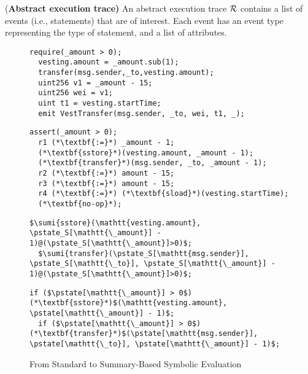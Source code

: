 \begin{definition}{{(\bf Abstract execution trace)}}
An abstract execution trace $\mathcal{R}$ contains a list of events (i.e., statements) that are of interest. Each event has an event type representing the type of statement, and a list
of attributes.
\end{definition}
    \begin{figure}[t!]
\begin{lstlisting}[title={(a) Solidity program}]
  require(_amount > 0);
  vesting.amount = _amount.sub(1);
  transfer(msg.sender,_to,vesting.amount);
  uint256 v1 = _amount - 15;
  uint256 wei = v1;
  uint t1 = vesting.startTime;
  emit VestTransfer(msg.sender, _to, wei, t1, _);
\end{lstlisting}
\begin{lstlisting}[title={(b) Symbolic evaluation}]
  assert(_amount > 0);
  r1 (*\textbf{:=}*) _amount - 1;
  (*\textbf{sstore}*)(vesting.amount, _amount - 1);
  (*\textbf{transfer}*)(msg.sender, _to, _amount - 1);
  r2 (*\textbf{:=}*) amount - 15;
  r3 (*\textbf{:=}*) amount - 15;
  r4 (*\textbf{:=}*) (*\textbf{sload}*)(vesting.startTime);
  (*\textbf{no-op}*);
\end{lstlisting}
\begin{lstlisting}[title={(c) Summary extraction}]
  $\sumi{sstore}(\mathtt{vesting.amount}, \pstate_S[\mathtt{\_amount}] - 1)@(\pstate_S[\mathtt{\_amount}]>0)$;
  $\sumi{transfer}(\pstate_S[\mathtt{msg.sender}], \pstate_S[\mathtt{\_to}], \pstate_S[\mathtt{\_amount}] - 1)@(\pstate_S[\mathtt{\_amount}]>0)$;
\end{lstlisting}
\begin{lstlisting}[title={(d) Summary interpretation}]
  if ($\pstate[\mathtt{\_amount}] > 0$) (*\textbf{sstore}*)$(\mathtt{vesting.amount}, \pstate[\mathtt{\_amount}] - 1)$;
  if ($\pstate[\mathtt{\_amount}] > 0$) (*\textbf{transfer}*)$(\pstate[\mathtt{msg.sender}], \pstate[\mathtt{\_to}], \pstate[\mathtt{\_amount}] - 1)$;
\end{lstlisting}
    \caption{\small From Standard to Summary-Based Symbolic Evaluation}
    \label{fig:sum-interp}
    \end{figure}

